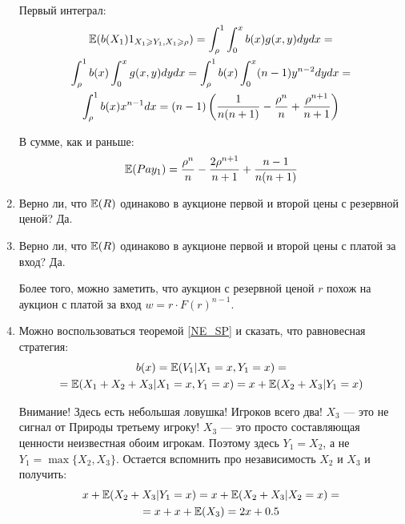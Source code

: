 \begin{enumerate}
Первый интеграл:
\begin{multline}
\mathbb{E}(b(X_{1})1_{X_{1}\geqslant Y_{1},X_{1}\geqslant \rho})=\int_{\rho}^{1} \int_{0}^{x} b(x)g(x,y)dy dx =\\
\int_{\rho}^{1} b(x) \int_{0}^{x} g(x,y)dy dx =\int_{\rho}^{1} b(x) \int_{0}^{x} (n-1) y^{n-2} dy dx =\\
\int_{\rho}^{1}b(x) x^{n-1} dx=(n-1)\left(\frac{1}{n(n+1)}-\frac{\rho^{n}}{n}+\frac{\rho^{n+1}}{n+1}\right)
\end{multline}

В сумме, как и раньше:
\begin{equation}
\mathbb{E}(Pay_{1})=\frac{\rho^{n}}{n}-\frac{2\rho^{n+1}}{n+1}+\frac{n-1}{n(n+1)}
\end{equation}

\item  Верно ли, что $ \mathbb{E}(R) $ одинаково в аукционе первой и второй цены с резервной ценой? Да.

\item  Верно ли, что $ \mathbb{E}(R) $ одинаково в аукционе первой и второй цены с платой за вход? Да.

Более того, можно заметить, что аукцион с резервной ценой $ r $ похож на аукцион с платой за вход $ w=r\cdot F(r)^{n-1} $.

\item %
Можно воспользоваться теоремой \ref{NE_SP} и сказать, что равновесная стратегия:
\begin{multline}
b(x)=\mathbb{E}(V_{1}|X_{1}=x,Y_{1}=x)=\\
=\mathbb{E}(X_{1}+X_{2}+X_{3}|X_{1}=x,Y_{1}=x)=x+\mathbb{E}(X_{2}+X_{3}|Y_{1}=x)
\end{multline}

Внимание! Здесь есть небольшая ловушка! Игроков всего два! $ X_{3} $ — это не сигнал от Природы третьему игроку! $ X_{3} $ — это просто составляющая ценности неизвестная обоим игрокам. Поэтому здесь $ Y_{1}=X_{2} $, а не $ Y_{1}=\max\{X_{2},X_{3}\} $. Остается вспомнить про независимость $ X_{2} $ и $ X_{3} $ и получить:
\begin{multline}
x+\mathbb{E}(X_{2}+X_{3}|Y_{1}=x)=x+\mathbb{E}(X_{2}+X_{3}|X_{2}=x)=\\
=x+x+\mathbb{E}(X_{3})=2x+0.5
\end{multline}


\end{enumerate}
